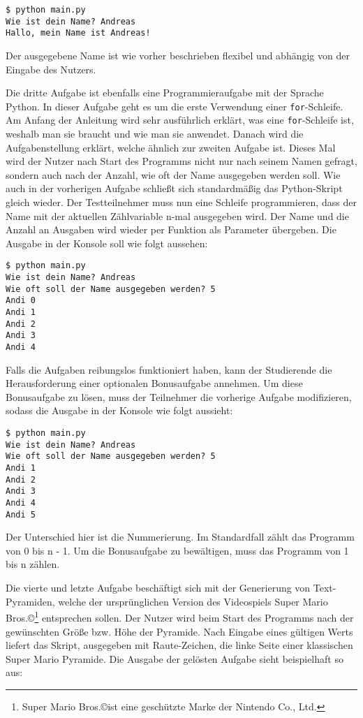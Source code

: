 \begin{lstlisting}[style=Bash]
$ python main.py
Wie ist dein Name? Andreas
Hallo, mein Name ist Andreas!
\end{lstlisting}

Der ausgegebene Name ist wie vorher beschrieben flexibel und abhängig von der
Eingabe des Nutzers.

Die dritte Aufgabe ist ebenfalls eine Programmieraufgabe mit der Sprache Python.
In dieser Aufgabe geht es um die erste Verwendung einer \texttt{for}-Schleife.
Am Anfang der Anleitung wird sehr ausführlich erklärt, was eine
\texttt{for}-Schleife ist, weshalb man sie braucht und wie man sie anwendet.
Danach wird die Aufgabenstellung erklärt, welche ähnlich zur zweiten Aufgabe
ist. Dieses Mal wird der Nutzer nach Start des Programms nicht nur nach seinem
Namen gefragt, sondern auch nach der Anzahl, wie oft der Name ausgegeben werden
soll. Wie auch in der vorherigen Aufgabe schließt sich standardmäßig das
Python-Skript gleich wieder. Der Testteilnehmer muss nun eine Schleife
programmieren, dass der Name mit der aktuellen Zählvariable n-mal ausgegeben
wird. Der Name und die Anzahl an Ausgaben wird wieder per Funktion als Parameter
übergeben. Die Ausgabe in der Konsole soll wie folgt aussehen:

\begin{lstlisting}[style=Bash]
$ python main.py
Wie ist dein Name? Andreas
Wie oft soll der Name ausgegeben werden? 5
Andi 0
Andi 1
Andi 2
Andi 3
Andi 4
\end{lstlisting}

Falls die Aufgaben reibungslos funktioniert haben, kann der Studierende
die Herausforderung einer optionalen Bonusaufgabe annehmen. Um diese
Bonusaufgabe zu lösen, muss der Teilnehmer die vorherige Aufgabe modifizieren,
sodass die Ausgabe in der Konsole wie folgt aussieht:

\begin{lstlisting}[style=Bash]
$ python main.py
Wie ist dein Name? Andreas
Wie oft soll der Name ausgegeben werden? 5
Andi 1
Andi 2
Andi 3
Andi 4
Andi 5
\end{lstlisting}

Der Unterschied hier ist die Nummerierung. Im Standardfall zählt das Programm
von 0 bis n - 1. Um die Bonusaufgabe zu bewältigen, muss das Programm von 1 bis
n zählen.

Die vierte und letzte Aufgabe beschäftigt sich mit der Generierung von
Text-Pyramiden, welche der ursprünglichen Version des Videospiels Super Mario
Bros.\copyright\footnote{Super Mario Bros.\copyright ist eine geschützte Marke
der Nintendo Co., Ltd.} entsprechen sollen. Der Nutzer wird beim Start des
Programms nach der gewünschten Größe bzw. Höhe der Pyramide. Nach Eingabe eines
gültigen  Werts liefert das Skript, ausgegeben mit Raute-Zeichen, die linke
Seite einer klassischen Super Mario Pyramide. Die Ausgabe der gelösten Aufgabe
sieht beispielhaft so aus:

